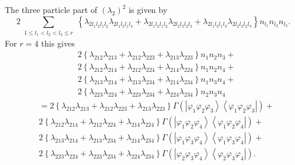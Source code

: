 \documentclass[aps,preprint]{revtex4}%
\begin{document}
The three particle part of $\left(  \lambda_{2}\right)  ^{2}$ is given by%
\begin{equation}
2\sum_{\substack{1\leq l_{1}<l_{2}<l_{3}\leq r}}\left\{  \lambda_{2l_{1}%
l_{2}l_{1}l_{2}}\lambda_{2l_{1}l_{3}l_{1}l_{3}}+\lambda_{2l_{1}l_{2}l_{1}%
l_{2}}\lambda_{2l_{2}l_{3}l_{2}l_{3}}+\lambda_{2l_{1}l_{3}l_{1}l_{3}}%
\lambda_{2l_{2}l_{3}l_{2}l_{3}}\right\}  n_{l_{1}}n_{l_{2}}n_{l_{3}}.\nonumber
\end{equation}
For $r=4$ this gives%
\begin{align}
&  2\left\{  \lambda_{212}\lambda_{213}+\lambda_{212}\lambda_{223}%
+\lambda_{213}\lambda_{223}\right\}  n_{1}n_{2}n_{3}+\nonumber\\
&  2\left\{  \lambda_{212}\lambda_{214}+\lambda_{212}\lambda_{224}%
+\lambda_{214}\lambda_{224}\right\}  n_{1}n_{2}n_{4}+\nonumber\\
&  2\left\{  \lambda_{213}\lambda_{214}+\lambda_{213}\lambda_{234}%
+\lambda_{214}\lambda_{234}\right\}  n_{1}n_{3}n_{4}+\nonumber\\
&  2\left\{  \lambda_{223}\lambda_{224}+\lambda_{223}\lambda_{234}%
+\lambda_{224}\lambda_{234}\right\}  n_{2}n_{3}n_{4}%
\end{align}%
\begin{align}
&  =2\left\{  \lambda_{212}\lambda_{213}+\lambda_{212}\lambda_{223}%
+\lambda_{213}\lambda_{223}\right\}  \Gamma\left(  \left\vert \varphi
_{1}\varphi_{2}\varphi_{3}\right\rangle \left\langle \varphi_{1}\varphi
_{2}\varphi_{3}\right\vert \right)  +\nonumber\\
&  2\left\{  \lambda_{212}\lambda_{214}+\lambda_{212}\lambda_{224}%
+\lambda_{214}\lambda_{224}\right\}  \Gamma\left(  \left\vert \varphi
_{1}\varphi_{2}\varphi_{4}\right\rangle \left\langle \varphi_{1}\varphi
_{2}\varphi_{4}\right\vert \right)  +\nonumber\\
&  2\left\{  \lambda_{213}\lambda_{214}+\lambda_{213}\lambda_{234}%
+\lambda_{214}\lambda_{234}\right\}  \Gamma\left(  \left\vert \varphi
_{1}\varphi_{3}\varphi_{4}\right\rangle \left\langle \varphi_{1}\varphi
_{3}\varphi_{4}\right\vert \right)  +\nonumber\\
&  2\left\{  \lambda_{223}\lambda_{224}+\lambda_{223}\lambda_{234}%
+\lambda_{224}\lambda_{234}\right\}  \Gamma\left(  \left\vert \varphi
_{2}\varphi_{3}\varphi_{4}\right\rangle \left\langle \varphi_{2}\varphi
_{3}\varphi_{4}\right\vert \right)  .
\end{align}
\end{document}
